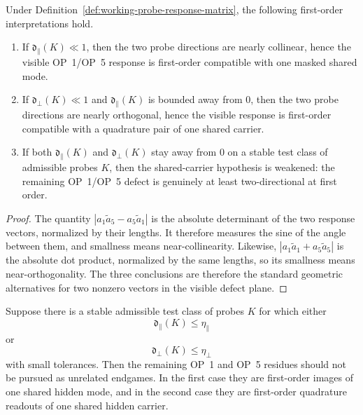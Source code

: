 \begin{proposition}
\label{prop:working-classification-shared-probe-response}
Under Definition~\ref{def:working-probe-response-matrix}, the following first-order interpretations hold.
\begin{enumerate}[label=(\roman*), leftmargin=2em]
 \item If $\mathfrak d_{\parallel}(K)\ll 1$, then the two probe directions are nearly collinear, hence the visible OP~1/OP~5 response is first-order compatible with one masked shared mode.
 \item If $\mathfrak d_{\perp}(K)\ll 1$ and $\mathfrak d_{\parallel}(K)$ is bounded away from $0$, then the two probe directions are nearly orthogonal, hence the visible response is first-order compatible with a quadrature pair of one shared carrier.
 \item If both $\mathfrak d_{\parallel}(K)$ and $\mathfrak d_{\perp}(K)$ stay away from $0$ on a stable test class of admissible probes $K$, then the shared-carrier hypothesis is weakened: the remaining OP~1/OP~5 defect is genuinely at least two-directional at first order.
\end{enumerate}
\end{proposition}

\begin{proof}
The quantity $|a_1\tilde a_5-a_5\tilde a_1|$ is the absolute determinant of the two response vectors, normalized by their lengths. It therefore measures the sine of the angle between them, and smallness means near-collinearity. Likewise, $|a_1\tilde a_1+a_5\tilde a_5|$ is the absolute dot product, normalized by the same lengths, so its smallness means near-orthogonality. The three conclusions are therefore the standard geometric alternatives for two nonzero vectors in the visible defect plane.
\end{proof}

\begin{corollary}
\label{cor:working-first-order-phase-picture-from-invariants}
Suppose there is a stable admissible test class of probes $K$ for which either
\[
 \mathfrak d_{\parallel}(K)\le \eta_{\parallel}
\]
or
\[
 \mathfrak d_{\perp}(K)\le \eta_{\perp}
\]
with small tolerances. Then the remaining OP~1 and OP~5 residues should not be pursued as unrelated endgames. In the first case they are first-order images of one shared hidden mode, and in the second case they are first-order quadrature readouts of one shared hidden carrier.
\end{corollary}

